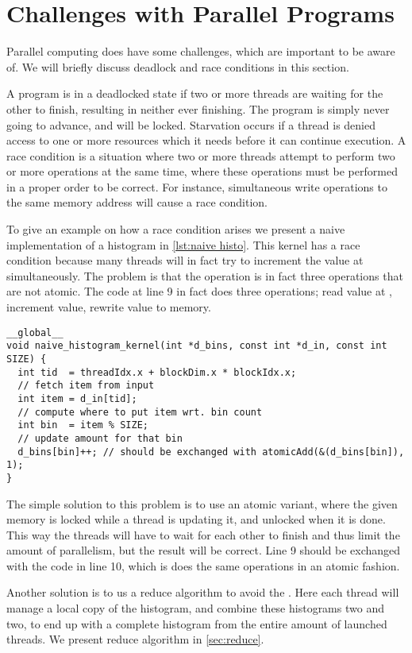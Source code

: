 \section{Challenges with Parallel Programs}
\label{sec:challenges with parallel programs}

Parallel computing does have some challenges, which are important to be aware of.
We will briefly discuss deadlock and race conditions in this section.

A program is in a deadlocked state if two or more threads are waiting for the other to finish, resulting in neither ever finishing.
The program is simply never going to advance, and will be locked.
Starvation occurs if a thread is denied access to one or more resources which it needs before it can continue execution.
A race condition is a situation where two or more threads attempt to perform two or more operations at the same time, where these operations must be performed in a proper order to be correct.
For instance, simultaneous write operations to the same memory address will cause a race condition.~\cite{farber2011cuda}

To give an example on how a race condition arises we present a naive implementation of a histogram in \cref{lst:naive histo}.
This kernel has a race condition because many threads will in fact try to increment the value at  simultaneously.
The problem is that the operation is in fact three operations that are not atomic.
The code at line 9 in fact does three operations; read value at , increment value, rewrite value to memory.

\begin{lstlisting}[caption={Naive histogram implementation with race condition}, label={lst:naive histo}]
__global__
void naive_histogram_kernel(int *d_bins, const int *d_in, const int SIZE) {
  int tid  = threadIdx.x + blockDim.x * blockIdx.x;
  // fetch item from input
  int item = d_in[tid];
  // compute where to put item wrt. bin count
  int bin  = item % SIZE;
  // update amount for that bin
  d_bins[bin]++; // should be exchanged with atomicAdd(&(d_bins[bin]), 1);
}
\end{lstlisting}

The simple solution to this problem is to use an atomic variant, where the given memory is locked while a thread is updating it, and unlocked when it is done.
This way the threads will have to wait for each other to finish and thus limit the amount of parallelism, but the result will be correct.
Line 9 should be exchanged with the code in line 10, which is does the same operations in an atomic fashion.

Another solution is to us a reduce algorithm to avoid the .
Here each thread will manage a local copy of the histogram, and combine these histograms two and two, to end up with a complete histogram from the entire amount of launched threads.
We present reduce algorithm in \cref{sec:reduce}.
